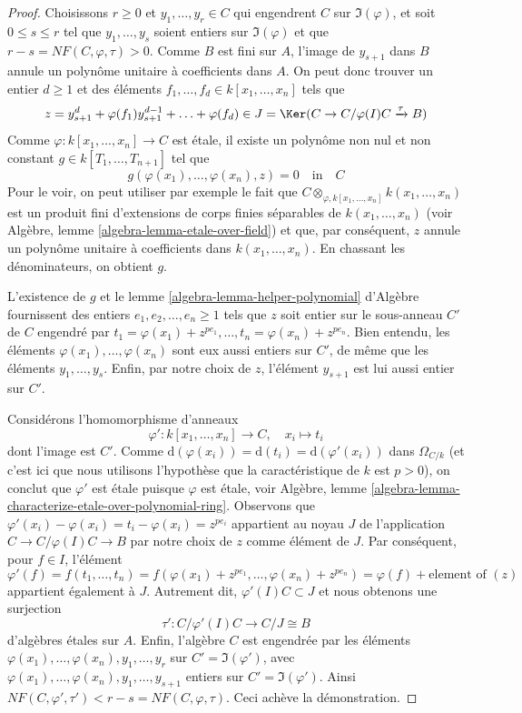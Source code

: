 \begin{proof}
Choisissons $r \geq 0$ et $y_1, \ldots, y_r \in C$ qui engendrent
$C$ sur $\Im(\varphi)$, et soit $0 \leq s \leq r$ tel que
$y_1, \ldots, y_s$ soient entiers sur $\Im(\varphi)$
et que $r - s = NF(C, \varphi, \tau) > 0$.
Comme $B$ est fini sur $A$, l'image de $y_{s + 1}$ dans $B$
annule un polynôme unitaire à coefficients dans $A$. On peut donc trouver
un entier $d \geq 1$ et des éléments $f_1, \ldots, f_d \in k[x_1, \ldots, x_n]$
tels que
$$
z = y_{s + 1}^d + \varphi(f_1) y_{s + 1}^{d - 1} + \ldots + \varphi(f_d) \in
J = \Ker(C \to C/\varphi(I)C \xrightarrow{\tau} B)
$$
Comme $\varphi : k[x_1, \ldots, x_n] \to C$ est \'etale, il existe un
polynôme non nul et non constant $g \in k[T_1, \ldots, T_{n + 1}]$
tel que
$$
g(\varphi(x_1), \ldots, \varphi(x_n), z) = 0
\quad\text{in}\quad
C
$$
Pour le voir, on peut utiliser par exemple le fait que
$C \otimes_{\varphi, k[x_1, \ldots, x_n]} k(x_1, \ldots, x_n)$
est un produit fini d'extensions de corps finies séparables
de $k(x_1, \ldots, x_n)$
(voir Algèbre, lemme \ref{algebra-lemma-etale-over-field})
et que, par conséquent, $z$ annule un polynôme unitaire
à coefficients dans $k(x_1, \ldots, x_n)$. En chassant les dénominateurs,
on obtient $g$.

\medskip\noindent
L'existence de $g$ et le
lemme \ref{algebra-lemma-helper-polynomial} d'Algèbre
fournissent des entiers $e_1, e_2, \ldots, e_n \geq 1$ tels que
$z$ soit entier sur le sous-anneau $C'$ de $C$ engendré par
$t_1 = \varphi(x_1) + z^{pe_1}, \ldots, t_n = \varphi(x_n) + z^{pe_n}$.
Bien entendu, les éléments $\varphi(x_1), \ldots, \varphi(x_n)$
sont eux aussi entiers sur $C'$, de même que les éléments
$y_1, \ldots, y_s$. Enfin, par notre choix de $z$, l'élément
$y_{s + 1}$ est lui aussi entier sur $C'$.

\medskip\noindent
Considérons l'homomorphisme d'anneaux
$$
\varphi' : k[x_1, \ldots, x_n] \longrightarrow C, \quad
x_i \longmapsto t_i
$$
dont l'image est $C'$. Comme
$\text{d}(\varphi(x_i)) = \text{d}(t_i) = \text{d}(\varphi'(x_i))$
dans $\Omega_{C/k}$ (et c'est ici que nous utilisons l'hypothèse que la caractéristique de $k$
est $p > 0$), on conclut que $\varphi'$ est \'etale puisque $\varphi$ est
\'etale, voir
Algèbre, lemme \ref{algebra-lemma-characterize-etale-over-polynomial-ring}.
Observons que $\varphi'(x_i) - \varphi(x_i) = t_i - \varphi(x_i) = z^{pe_i}$
appartient au noyau $J$ de l'application $C \to C/\varphi(I)C \to B$ par notre
choix de $z$ comme élément de $J$.
Par conséquent, pour $f \in I$, l'élément
$$
\varphi'(f) =
f(t_1, \ldots, t_n) =
f(\varphi(x_1) + z^{pe_1}, \ldots, \varphi(x_n) + z^{pe_n}) =
\varphi(f) + \text{element of }(z)
$$
appartient également à $J$. Autrement dit, $\varphi'(I)C \subset J$ et
nous obtenons une surjection
$$
\tau' : C/\varphi'(I)C \longrightarrow C/J \cong B
$$
d'algèbres \'etales sur $A$. Enfin, l'algèbre
$C$ est engendrée par les éléments
$\varphi(x_1), \ldots, \varphi(x_n), y_1, \ldots, y_r$
sur $C' = \Im(\varphi')$, avec
$\varphi(x_1), \ldots, \varphi(x_n), y_1, \ldots, y_{s + 1}$
entiers sur $C' = \Im(\varphi')$. Ainsi
$NF(C, \varphi', \tau') < r - s = NF(C, \varphi, \tau)$.
Ceci achève la démonstration.
\end{proof}

